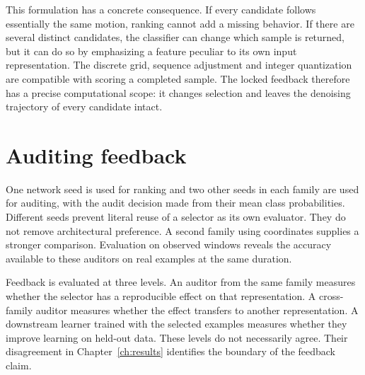 This formulation has a concrete consequence. If every candidate follows essentially the same motion, ranking cannot add a missing behavior. If there are several distinct candidates, the classifier can change which sample is returned, but it can do so by emphasizing a feature peculiar to its own input representation. The discrete grid, sequence adjustment and integer quantization are compatible with scoring a completed sample. The locked feedback therefore has a precise computational scope: it changes selection and leaves the denoising trajectory of every candidate intact.

\section{Auditing feedback}
One network seed is used for ranking and two other seeds in each family are used for auditing, with the audit decision made from their mean class probabilities. Different seeds prevent literal reuse of a selector as its own evaluator. They do not remove architectural preference. A second family using coordinates supplies a stronger comparison. Evaluation on observed windows reveals the accuracy available to these auditors on real examples at the same duration.

Feedback is evaluated at three levels. An auditor from the same family measures whether the selector has a reproducible effect on that representation. A cross-family auditor measures whether the effect transfers to another representation. A downstream learner trained with the selected examples measures whether they improve learning on held-out data. These levels do not necessarily agree. Their disagreement in Chapter~\ref{ch:results} identifies the boundary of the feedback claim.
